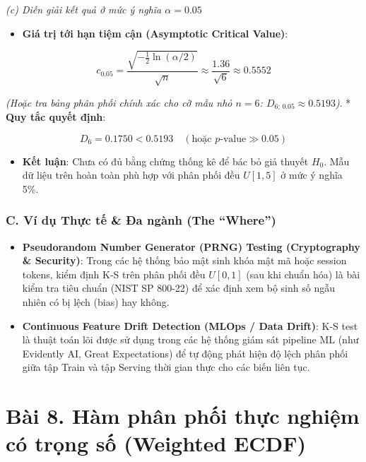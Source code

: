 \documentclass[12pt,a4paper]{article}
\begin{document}
\emph{(c) Diễn giải kết quả ở mức ý nghĩa \(\alpha = 0.05\)}

\begin{itemize}

\item
  \textbf{Giá trị tới hạn tiệm cận (Asymptotic Critical Value)}:
\end{itemize}

\[c_{0.05} = \frac{\sqrt{-\frac{1}{2} \ln(\alpha/2)}}{\sqrt{n}} \approx \frac{1.36}{\sqrt{6}} \approx 0.5552\]

\emph{(Hoặc tra bảng phân phối chính xác cho cỡ mẫu nhỏ \(n = 6\): \(D_{6; \, 0.05} \approx 0.5193\))}.
* \textbf{Quy tắc quyết định}:

\[D_6 = 0.1750 < 0.5193 \quad (\text{hoặc } p\text{-value} \gg 0.05)\]

\begin{itemize}

\item
  \textbf{Kết luận}: Chưa có đủ bằng chứng thống kê để bác bỏ giả thuyết \(H_0\). Mẫu dữ liệu trên hoàn toàn phù hợp với phân phối đều \(U[1, 5]\) ở mức ý nghĩa 5\%.
\end{itemize}

\subsubsection{C. Ví dụ Thực tế \& Đa ngành (The ``Where'')}\label{c.-vuxed-dux1ee5-thux1ef1c-tux1ebf-ux111a-nguxe0nh-the-where-6}

\begin{itemize}

\item
  \textbf{Pseudorandom Number Generator (PRNG) Testing (Cryptography \& Security)}: Trong các hệ thống bảo mật sinh khóa mật mã hoặc session tokens, kiểm định K-S trên phân phối đều \(U[0, 1]\) (sau khi chuẩn hóa) là bài kiểm tra tiêu chuẩn (NIST SP 800-22) để xác định xem bộ sinh số ngẫu nhiên có bị lệch (bias) hay không.
\item
  \textbf{Continuous Feature Drift Detection (MLOps / Data Drift)}: K-S test là thuật toán lõi được sử dụng trong các hệ thống giám sát pipeline ML (như Evidently AI, Great Expectations) để tự động phát hiện độ lệch phân phối giữa tập Train và tập Serving thời gian thực cho các biến liên tục.
\end{itemize}

\section{Bài 8. Hàm phân phối thực nghiệm có trọng số (Weighted ECDF)}\label{buxe0i-8.-huxe0m-phuxe2n-phux1ed1i-thux1ef1c-nghiux1ec7m-cuxf3-trux1ecdng-sux1ed1-weighted-ecdf}
\end{document}
